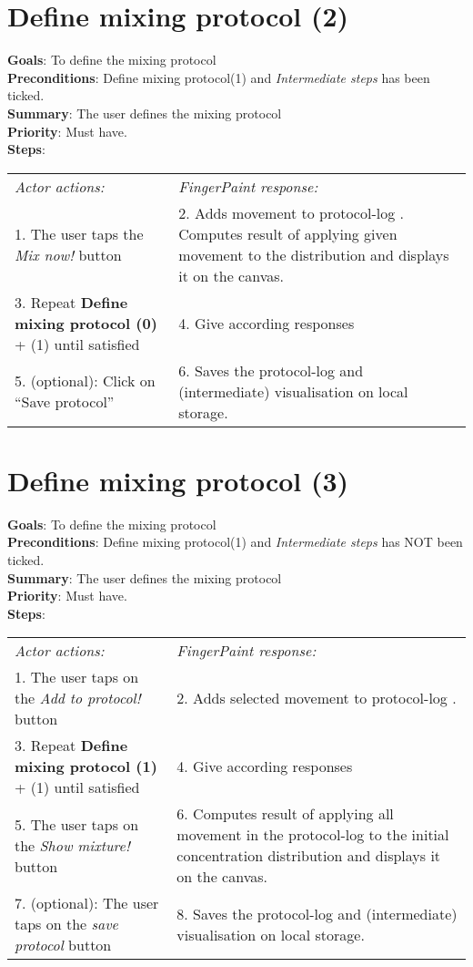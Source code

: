\begin{appendices}
  \section{Define mixing protocol (2)}
  \textbf{Goals}: To define the mixing protocol\\
  \textbf{Preconditions}: Define mixing protocol(1) and \emph{Intermediate steps} has been ticked.\\
  \textbf{Summary}: The user defines the mixing protocol\\
  \textbf{Priority}: Must have.\\
  \textbf{Steps}: \\
  \begin{tabular}{ p{} p{} }
  	\emph{Actor actions:} & \emph{FingerPaint response:} \\
    1. The user taps the \emph{Mix now!} button & 2.	Adds movement to protocol-log . Computes result of applying given movement to the distribution and displays it on the canvas.\\
    3.	Repeat \textbf{Define mixing protocol (0)} + (1) until satisfied & 4.	Give according responses\\
    5.	(optional): Click on “Save protocol” & 6.	Saves the protocol-log and (intermediate) visualisation on local storage.\\
  \end{tabular}

 \section{Define mixing protocol (3)}
  \textbf{Goals}: To define the mixing protocol\\
  \textbf{Preconditions}: Define mixing protocol(1) and \emph{Intermediate steps} has NOT been ticked.\\
  \textbf{Summary}: The user defines the mixing protocol\\
  \textbf{Priority}: Must have.\\
  \textbf{Steps}: \\
  \begin{tabular}{ p{} p{} }
  	\emph{Actor actions:} & \emph{FingerPaint response:} \\
    1.	The user taps on  the \emph{Add to protocol!} button	& 2.	Adds selected movement to protocol-log . \\
    3.	Repeat \textbf{Define mixing protocol (1)} + (1) until satisfied	& 4.	Give according responses\\
    5.	The user taps on the \emph{Show mixture!} button	& 6.	Computes result of applying all movement in the protocol-log to the initial concentration distribution and displays it on the canvas.\\
    7.	(optional): The user taps on the \emph{save protocol} button & 8.	Saves the protocol-log and (intermediate) visualisation on local storage.\\
  \end{tabular}
\end{appendices}
